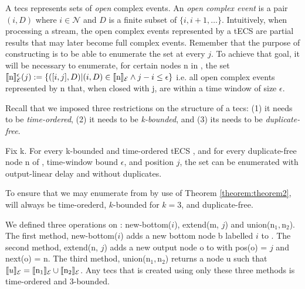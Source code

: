 A \acrshort{tecs} represents sets of \emph{open} complex events. An \emph{open complex event} is a pair $(i, D)$ where $i \in \mathcal{N}$ and $D$ is a finite subset of $\{i, i+1, \ldots\}$. Intuitively, when processing a stream, the open complex events represented by a tECS are partial results that may later become full complex events. Remember that the purpose of constructing \tecs is to be able to enumerate the set \enumCEA at every $j$. To achieve that goal, it will be necessary to enumerate, for certain nodes n in \tecs, the set $\llbracket \text{n} \rrbracket^{\epsilon}_{\mathcal{E}}(j) := \{ ([i, j], D) | (i, D) \in \llbracket \text{n} \rrbracket_{\mathcal{E}} \land j - i \leq \epsilon \}$ i.e. all open complex events represented by n that, when closed with j, are within a time window of size $\epsilon$.

Recall that we imposed three restrictions on the structure of a \acrshort{tecs}: (1) it needs to be \emph{time-ordered}, (2) it needs to be \emph{k-bounded}, and (3) its needs to be \emph{duplicate-free}.

\begin{theorem}\label{theorem:theorem2}
Fix k. For every k-bounded and time-ordered tECS \tecs, and for every duplicate-free node n of \tecs, time-window bound $\epsilon$, and position $j$, the set \enumNode can be enumerated with output-linear delay and without duplicates.
\end{theorem}

To ensure that we may enumerate \enumCEA from \tecs by use of Theorem \ref{theorem:theorem2}, \tecs will always be time-orederd, $k$-bounded for $k = 3$, and duplicate-free.

We defined three operations on \tecs: new-bottom($i$), extend(m, $j$) and union($\text{n}_{1},\text{n}_{2}$). The first method, new-bottom($i$) adds a new bottom node b labelled $i$ to \tecs. The second method, extend(n, $j$) adds a new output node o to \tecs with pos(o) = $j$ and next(o) = n. The third method, union($\text{n}_{1},\text{n}_{2}$) returns a node u such that $\llbracket u \rrbracket_{\mathcal{E}} = \llbracket \text{n}_{1} \rrbracket_{\mathcal{E}} \cup \llbracket \text{n}_{2} \rrbracket_{\mathcal{E}}$. Any \acrshort{tecs} that is created using only these three methods is time-ordered and $3$-bounded.


